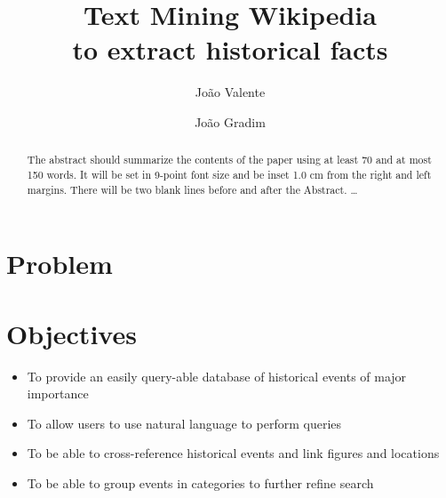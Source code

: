 \documentclass{llncs}
\begin{document}
\mainmatter              %
%
\title{Text Mining Wikipedia\\to extract historical facts}
%
%
\author{João Valente \and João Gradim}
%
%
%

\maketitle              %

\begin{abstract}
The abstract should summarize the contents of the paper
using at least 70 and at most 150 words. It will be set in 9-point
font size and be inset 1.0 cm from the right and left margins.
There will be two blank lines before and after the Abstract. \dots
\end{abstract}

\section{Problem}

\section{Objectives}

\begin{itemize}
	\item To provide an easily query-able database of historical events of major importance
	\item To allow users to use natural language to perform queries
	\item To be able to cross-reference historical events and link figures and locations
	\item To be able to group events in categories to further refine search
\end{itemize}
\end{document}
